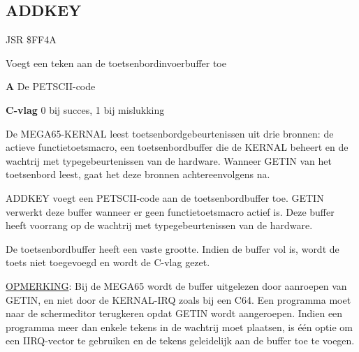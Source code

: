 \subsection{ADDKEY}
\label{KERNAL Jump Table!ADDKEY}
\begin{description}[leftmargin=2cm,style=nextline]
    \item [Adres:] JSR \$FF4A    \item [Omschrijving:] Voegt een teken aan de toetsenbordinvoerbuffer toe    \item [Invoer:]        \textbf{A} De PETSCII-code    \item [Uitvoer:]        \textbf{C-vlag} 0 bij succes, 1 bij mislukking    \item [Opmerkingen:]        De MEGA65-KERNAL leest toetsenbordgebeurtenissen uit drie bronnen: de actieve functietoetsmacro, een toetsenbordbuffer die de KERNAL beheert en de wachtrij met typegebeurtenissen van de hardware. Wanneer GETIN van het toetsenbord leest, gaat het deze bronnen achtereenvolgens na.

        ADDKEY voegt een PETSCII-code aan de toetsenbordbuffer toe. GETIN verwerkt deze buffer wanneer er geen functietoetsmacro actief is. Deze buffer heeft voorrang op de wachtrij met typegebeurtenissen van de hardware.

        De toetsenbordbuffer heeft een vaste grootte. Indien de buffer vol is, wordt de toets niet toegevoegd en wordt de C-vlag gezet.

        \underline{OPMERKING}: Bij de MEGA65 wordt de buffer uitgelezen door aanroepen van GETIN, en niet door de KERNAL-IRQ zoals bij een C64. Een programma moet naar de schermeditor terugkeren opdat GETIN wordt aangeroepen. Indien een programma meer dan enkele tekens in de wachtrij moet plaatsen, is één optie om een IIRQ-vector te gebruiken en de tekens geleidelijk aan de buffer toe te voegen.

    \item [Voorbeeld:]

\end{description}


